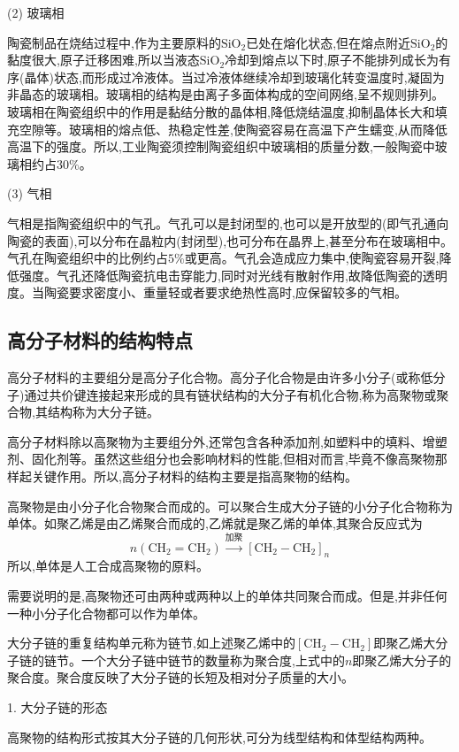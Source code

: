\documentclass[UTF8]{ctexbook}
\newcommand{\◎}{\ensuremath{\bigcirc}}
\begin{document}
(2) 玻璃相

陶瓷制品在烧结过程中,作为主要原料的$\text{SiO}_2$已处在熔化状态,但在熔点附近$\text{SiO}_2$的黏度很大,原子迁移困难,所以当液态$\text{SiO}_2$冷却到熔点以下时,原子不能排列成长为有序(晶体)状态,而形成过冷液体。当过冷液体继续冷却到玻璃化转变温度时,凝固为非晶态的玻璃相。玻璃相的结构是由离子多面体构成的空间网络,呈不规则排列。
玻璃相在陶瓷组织中的作用是黏结分散的晶体相,降低烧结温度,抑制晶体长大和填充空隙等。玻璃相的熔点低、热稳定性差,使陶瓷容易在高温下产生蠕变,从而降低高温下的强度。所以,工业陶瓷须控制陶瓷组织中玻璃相的质量分数,一般陶瓷中玻璃相约占$30\%$。

(3) 气相

气相是指陶瓷组织中的气孔。气孔可以是封闭型的,也可以是开放型的(即气孔通向陶瓷的表面),可以分布在晶粒内(封闭型),也可分布在晶界上,甚至分布在玻璃相中。气孔在陶瓷组织中的比例约占$5\%$或更高。气孔会造成应力集中,使陶瓷容易开裂,降低强度。气孔还降低陶瓷抗电击穿能力,同时对光线有散射作用,故降低陶瓷的透明度。当陶瓷要求密度小、重量轻或者要求绝热性高时,应保留较多的气相。

\subsection{高分子材料的结构特点}
高分子材料的主要组分是高分子化合物。高分子化合物是由许多小分子(或称低分子)通过共价键连接起来形成的具有链状结构的大分子有机化合物,称为高聚物或聚合物,其结构称为大分子链。

高分子材料除以高聚物为主要组分外,还常包含各种添加剂,如塑料中的填料、增塑剂、固化剂等。虽然这些组分也会影响材料的性能,但相对而言,毕竟不像高聚物那样起关键作用。所以,高分子材料的结构主要是指高聚物的结构。

高聚物是由小分子化合物聚合而成的。可以聚合生成大分子链的小分子化合物称为单体。如聚乙烯是由乙烯聚合而成的,乙烯就是聚乙烯的单体,其聚合反应式为
\[ n(\text{CH}_2=\text{CH}_2) \xrightarrow{\text{加聚}} [\text{CH}_2-\text{CH}_2]_n \]
所以,单体是人工合成高聚物的原料。

需要说明的是,高聚物还可由两种或两种以上的单体共同聚合而成。但是,并非任何一种小分子化合物都可以作为单体。

大分子链的重复结构单元称为链节,如上述聚乙烯中的$[\text{CH}_2-\text{CH}_2]$即聚乙烯大分子链的链节。一个大分子链中链节的数量称为聚合度,上式中的$n$即聚乙烯大分子的聚合度。聚合度反映了大分子链的长短及相对分子质量的大小。

1. 大分子链的形态

高聚物的结构形式按其大分子链的几何形状,可分为线型结构和体型结构两种。
\end{document}
